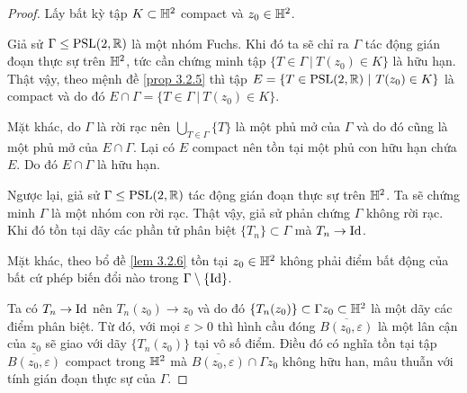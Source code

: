 \begin{proof}
    Lấy bất kỳ tập $K \subset \mathbb{H}^2$ compact và $z_0 \in \mathbb{H}^2$. 
    
    Giả sử $\Gamma \leq \operatorname{PSL}(2,\mathbb{R})$ là một nhóm Fuchs. Khi đó ta sẽ chỉ ra $\Gamma$ tác động gián đoạn thực sự trên $\mathbb{H}^2$, tức cần chứng minh tập
    $\{T \in \Gamma~|~T(z_0) \in K\}$
    là hữu hạn.  
    Thật vậy, theo mệnh đề \ref{prop 3.2.5} thì tập 
    $E = \{T \in \operatorname{PSL}(2,\mathbb{R})~|~T(z_0) \in K\}$ 
    là compact và do đó $E \cap \Gamma = \{T \in \Gamma~|~T(z_0) \in K\}$. 

    Mặt khác, do $\Gamma$ là rời rạc nên $\bigcup_{T \in \Gamma}\{T\}$ là một phủ mở của $\Gamma$ và do đó cũng là một phủ mở của $E \cap \Gamma$. Lại có $E$ compact nên tồn tại một phủ con hữu hạn chứa $E$. Do đó $E \cap \Gamma$ là hữu hạn.

    Ngược lại, giả sử $\Gamma \leq \operatorname{PSL}(2,\mathbb{R})$ tác động gián đoạn thực sự trên $\mathbb{H}^2$. Ta sẽ chứng minh $\Gamma$ là một nhóm con rời rạc. Thật vậy, giả sử phản chứng $\Gamma$ không rời rạc. Khi đó tồn tại dãy các phần tử phân biệt $\{T_n\} \subset \Gamma$ mà $T_n \to \operatorname{Id}$.

    Mặt khác, theo bổ đề \ref{lem 3.2.6} tồn tại $z_0 \in \mathbb{H}^2$ không phải điểm bất động của bất cứ phép biến đổi nào trong $\Gamma \setminus\{\operatorname{Id}\}$. 

    Ta có $T_n \to \operatorname{Id}$ nên $T_n(z_0) \to z_0$ và do đó $\{T_n(z_0)\} \subset \Gamma z_0 \subset \mathbb{H}^2$ là một dãy các điểm phân biệt. Từ đó, với mọi $\varepsilon>0$ thì hình cầu đóng $\overline{B(z_0,\varepsilon)}$ là một lân cận của $z_0$ sẽ giao với dãy $\{T_n(z_0)\}$ tại vô số điểm. Điều đó có nghĩa tồn tại tập $\overline{B(z_0,\varepsilon)}$ compact trong $\mathbb{H}^2$ mà $\overline{B(z_0,\varepsilon)} \cap \Gamma z_0$ không hữu han, mâu thuẫn với tính gián đoạn thực sự của $\Gamma$.
\end{proof}

